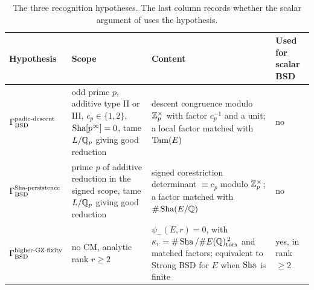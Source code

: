 \begin{table}[tbp]
\centering
\footnotesize
\caption{The three recognition hypotheses.  The last column records
whether the scalar argument of 
uses the hypothesis.}
\label{tab:recognition-sources}
\begin{tabularx}{\textwidth}{@{}>{\raggedright\arraybackslash}p{}
>{\raggedright\arraybackslash}p{}
>{\raggedright\arraybackslash}X
>{\raggedright\arraybackslash}p{}@{}}
\toprule
Hypothesis & Scope & Content & Used for scalar BSD \\
\midrule
\(\Gamma_{\mathrm{BSD}}^{\mathrm{padic\text{-}descent}}\) & odd prime \(p\), additive type II or III, \(c_p\in\{1,2\}\),
\(\operatorname{Sha}[p^\infty]=0\), tame \(L/\mathbb{Q}_p\) giving good reduction & descent congruence
modulo \(\mathbb{Z}_p^\times\) with factor \(c_p^{-1}\) and a unit; a local factor
matched with \(\operatorname{Tam}(E)\) & no \\
\addlinespace
\(\Gamma_{\mathrm{BSD}}^{\mathrm{Sha\text{-}persistence}}\) & prime \(p\) of additive reduction in the signed scope, tame \(L/\mathbb{Q}_p\) giving good reduction & signed corestriction determinant \(\equiv c_p\)
modulo \(\mathbb{Z}_p^\times\); a factor matched with \(\#\operatorname{Sha}(E/\mathbb{Q})\) & no \\
\addlinespace
\(\Gamma_{\mathrm{BSD}}^{\mathrm{higher\text{-}GZ\text{-}fixity}}\) & no CM, analytic rank \(r\ge2\) & \(\psi_-(E,r)=0\), with
\(\kappa_r=\#\operatorname{Sha}/\#E(\mathbb{Q})_{\operatorname{tors}}^{\,2}\) and matched factors; equivalent to
Strong BSD for \(E\) when \(\operatorname{Sha}\) is finite & yes, in rank \(\ge2\) \\
\bottomrule
\end{tabularx}
\end{table}
